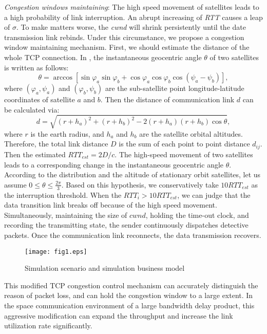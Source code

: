 \documentclass[draftclsnofoot,onecolumn,11pt]{IEEEtran}
\begin{document}
 \emph{Congestion windows maintaining}: The high speed movement of satellites leads to a high probability of link interruption. An abrupt increasing of \emph{RTT} causes a leap of $\sigma$. To make matters worse, the \emph{cwnd} will shrink persistently until the date transmission link rebinds. Under this circumstance, we propose a congestion window maintaining mechanism. First, we should estimate the distance of the whole TCP connection. In \cite{pan2011improvement}, the instantaneous geocentric angle $\theta$ of two satellites is written as follows:
    \begin{equation}\label{6}
\theta=\arccos[\sin\varphi_{a}\sin\varphi_{b}+\cos\varphi_{a}\cos\varphi_{b}\cos(\psi_{a}-\psi_{b})],
   \end{equation}
where $(\varphi_{a},\psi_{a})$ and $(\varphi_{b},\psi_{b})$ are the sub-satellite point longitude-latitude coordinates of satellite $a$ and $b$. Then the distance of communication link $d$ can be calculated via:
\begin{equation}\label{7}
d\!=\!\sqrt{(r+h_{a})^{2}+(r+h_{b})^{2}-2(r+h_{a})(r+h_{b})\cos\theta},
\end{equation}
where $r$ is the earth radius, and $h_{a}$ and $h_{b}$ are the satellite orbital altitudes. Therefore, the total link distance $D$ is the sum of each point to point distance $d_{ij}$. Then the estimated $RTT_{est}=2D/c$.
The high-speed movement of two satellites leads to a corresponding change in the instantaneous geocentric angle $\theta$. According to the distribution and the altitude of stationary orbit satellites, let us assume $0\leq\theta\leq\frac{2\pi}{3}$. Based on this hypothesis, we conservatively take $10RTT_{est}$ as the interruption threshold.
When the $RTT_{i}>10RTT_{est}$, we can judge that the data transition link breaks off because of the high speed movement.
Simultaneously, maintaining the size of $cwnd$, holding the time-out clock, and recording the transmitting state, the sender continuously dispatches detective packets. Once the communication link reconnects, the data transmission recovers.

\begin{figure}[!t]
\centering
\texttt{[image: fig1.eps]}\\
\caption{\!Simulation scenario and simulation business model}
\label{Fig.1}
\end{figure}

This modified TCP congestion control mechanism can accurately distinguish the reason of packet loss, and can hold the congestion window to a large extent. In the space communication environment of a large bandwidth delay product, this aggressive modification can expand the throughput and increase the link utilization rate significantly.
\end{document}
